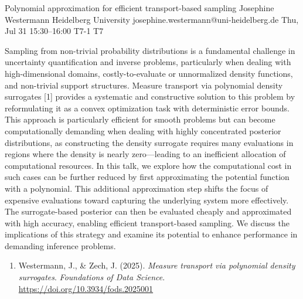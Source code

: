 \documentclass[12pt,lettersize,oneside]{book} %
\begin{document}
\begin{talk}
  {Polynomial approximation for efficient transport-based sampling}%
  {Josephine Westermann}%
  {Heidelberg University}%
  {josephine.westermann@uni-heidelberg.de}%
  {}%
  {}%
  {Thu, Jul 31 15:30--16:00}%
  {T7-1}%
  {T7}%
  {}%
  {}

Sampling from non-trivial probability distributions is a fundamental challenge in uncertainty quantification and inverse problems, particularly when dealing with high-dimensional domains, costly-to-evaluate or unnormalized density functions, and non-trivial support structures. Measure transport via polynomial density surrogates [1] provides a systematic and constructive solution to this problem by reformulating it as a convex optimization task with deterministic error bounds. This approach is particularly efficient for smooth problems but can become computationally demanding when dealing with highly concentrated posterior distributions, as constructing the density surrogate requires many evaluations in regions where the density is nearly zero—leading to an inefficient allocation of computational resources. In this talk, we explore how the computational cost in such cases can be further reduced by first approximating the potential function with a polynomial. This additional approximation step shifts the focus of expensive evaluations toward capturing the underlying system more effectively. The surrogate-based posterior can then be evaluated cheaply and approximated with high accuracy, enabling efficient transport-based sampling. We discuss the implications of this strategy and examine its potential to enhance performance in demanding inference problems.

\medskip

\begin{enumerate}
 \item[{[1]}] Westermann, J., \& Zech, J. (2025). \textit{Measure transport via polynomial density surrogates}. \textit{Foundations of Data Science}. \url{https://doi.org/10.3934/fods.2025001}
\end{enumerate}

\end{talk}
\end{document}
